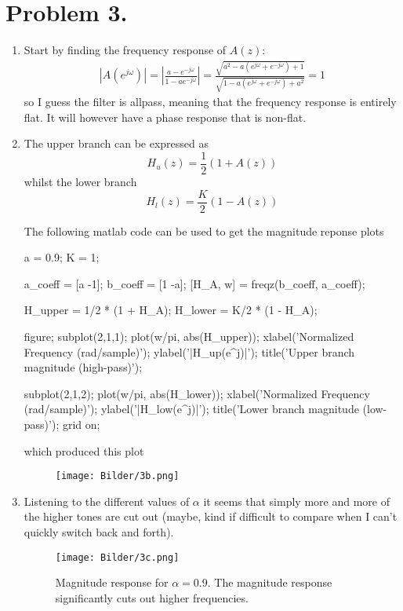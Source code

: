 \documentclass[a4paper,11pt,norsk]{article}
\begin{document}
\section*{Problem 3.}
\begin{enumerate}
    \item 
        Start by finding the frequency response of $A(z)$:
        \begin{align*}
            |A(e^{j\omega})| = \left| \frac{a - e^{-j\omega}}{1 - ae^{-j\omega}}\right| = \frac{\sqrt{ a^2 - a(e^{j\omega} + e^{-j\omega}) +1}}{\sqrt{ 1 - a(e^{j\omega} + e^{-j\omega}) + a^2 }} = 1
        \end{align*}
        so I guess the filter is allpass, meaning that the frequency response is entirely flat. It will however have a phase response that is non-flat.

    \item 
        The upper branch can be expressed as
        \[
            H_u(z) = \frac{1}{2}(1 + A(z))
        \]
        whilst the lower branch
        \[
            H_l(z) = \frac{K}{2}(1 - A(z))
        \]

        The following matlab code can be used to get the magnitude reponse plots
\begin{matlabcode}
a = 0.9;
K = 1;

a_coeff = [a -1];
b_coeff = [1 -a];
[H_A, w] = freqz(b_coeff, a_coeff);

H_upper = 1/2 * (1 + H_A);
H_lower = K/2 * (1 - H_A);

figure;
subplot(2,1,1);
plot(w/pi, abs(H_upper));
xlabel('Normalized Frequency (\times\pi rad/sample)');
ylabel('|H_{up}(e^{j\omega})|');
title('Upper branch magnitude (high-pass)');

subplot(2,1,2);
plot(w/pi, abs(H_lower));
xlabel('Normalized Frequency (\times\pi rad/sample)');
ylabel('|H_{low}(e^{j\omega})|');
title('Lower branch magnitude (low-pass)');
grid on;
\end{matlabcode}

        which produced this plot
        \begin{figure}[H]
            \centering
            \texttt{[image: Bilder/3b.png]}
        \end{figure}


    \item Listening to the different values of $\alpha$ it seems that simply more and more of the higher tones are cut out (maybe, kind if difficult to 
        compare when I can't quickly switch back and forth).
        \begin{figure}[H]
            \centering
            \texttt{[image: Bilder/3c.png]}
            \caption{Magnitude response for $\alpha=0.9$. The magnitude response significantly cuts out higher frequencies.}
        \end{figure}


\end{enumerate}
\end{document}
